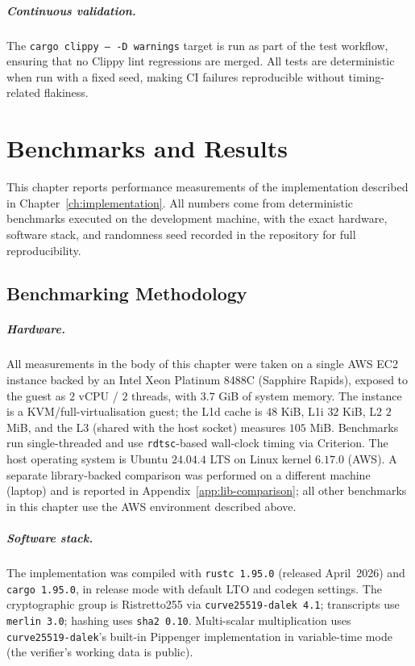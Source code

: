 \documentclass[12pt,a4paper,oneside]{report}
\begin{document}
\paragraph{Continuous validation.}
The \texttt{cargo clippy -- -D warnings} target is run as part of the 
test workflow, ensuring that no Clippy lint regressions are merged. All 
tests are deterministic when run with a fixed seed, making CI failures 
reproducible without timing-related flakiness.
\chapter{Benchmarks and Results}
\label{ch:results}

This chapter reports performance measurements of the implementation 
described in Chapter~\ref{ch:implementation}. All numbers come from 
deterministic benchmarks executed on the development machine, with the 
exact hardware, software stack, and randomness seed recorded in the 
repository for full reproducibility.

\section{Benchmarking Methodology}
\label{sec:bench-methodology}

\paragraph{Hardware.}
All measurements in the body of this chapter were taken on a single AWS
EC2 instance backed by an Intel Xeon Platinum 8488C (Sapphire Rapids),
exposed to the guest as $2$ vCPU / $2$ threads, with $3.7$ GiB of
system memory. The instance is a KVM/full-virtualisation guest; the L1d
cache is $48$ KiB, L1i $32$ KiB, L2 $2$ MiB, and the L3 (shared with the
host socket) measures $105$ MiB. Benchmarks run single-threaded and use
\texttt{rdtsc}-based wall-clock timing via Criterion. The host operating
system is Ubuntu $24.04.4$ LTS on Linux kernel $6.17.0$ (AWS). A separate
library-backed comparison was performed on a different machine (laptop)
and is reported in Appendix~\ref{app:lib-comparison}; all other benchmarks
in this chapter use the AWS environment described above.

\paragraph{Software stack.}
The implementation was compiled with \texttt{rustc 1.95.0} (released
April~2026) and \texttt{cargo 1.95.0}, in release mode with default
LTO and codegen settings. The cryptographic group is Ristretto255 via
\texttt{curve25519-dalek 4.1}; transcripts use \texttt{merlin 3.0};
hashing uses \texttt{sha2 0.10}. Multi-scalar multiplication uses
\texttt{curve25519-dalek}'s built-in Pippenger implementation in
variable-time mode (the verifier's working data is public).
\end{document}
